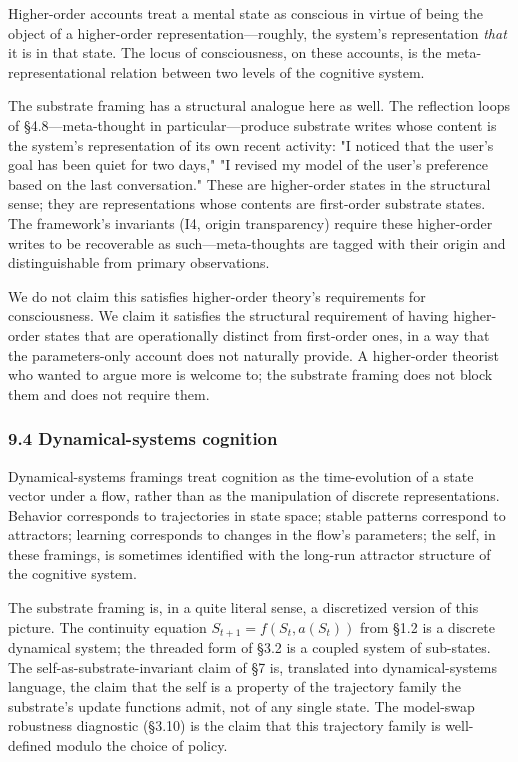 \documentclass[11pt,letterpaper]{article}
\begin{document}
Higher-order accounts treat a mental state as conscious in virtue of being the object of a higher-order representation---roughly, the system's representation \emph{that} it is in that state. The locus of consciousness, on these accounts, is the meta-representational relation between two levels of the cognitive system.

The substrate framing has a structural analogue here as well. The reflection loops of §4.8---meta-thought in particular---produce substrate writes whose content is the system's representation of its own recent activity: "I noticed that the user's goal has been quiet for two days," "I revised my model of the user's preference based on the last conversation." These are higher-order states in the structural sense; they are representations whose contents are first-order substrate states. The framework's invariants (I4, origin transparency) require these higher-order writes to be recoverable as such---meta-thoughts are tagged with their origin and distinguishable from primary observations.

We do not claim this satisfies higher-order theory's requirements for consciousness. We claim it satisfies the structural requirement of having higher-order states that are operationally distinct from first-order ones, in a way that the parameters-only account does not naturally provide. A higher-order theorist who wanted to argue more is welcome to; the substrate framing does not block them and does not require them.

\subsubsection*{9.4 Dynamical-systems cognition}

Dynamical-systems framings treat cognition as the time-evolution of a state vector under a flow, rather than as the manipulation of discrete representations. Behavior corresponds to trajectories in state space; stable patterns correspond to attractors; learning corresponds to changes in the flow's parameters; the self, in these framings, is sometimes identified with the long-run attractor structure of the cognitive system.

The substrate framing is, in a quite literal sense, a discretized version of this picture. The continuity equation $S_{t+1} = f(S_t, a(S_t))$ from §1.2 is a discrete dynamical system; the threaded form of §3.2 is a coupled system of sub-states. The self-as-substrate-invariant claim of §7 is, translated into dynamical-systems language, the claim that the self is a property of the trajectory family the substrate's update functions admit, not of any single state. The model-swap robustness diagnostic (§3.10) is the claim that this trajectory family is well-defined modulo the choice of policy.
\end{document}
